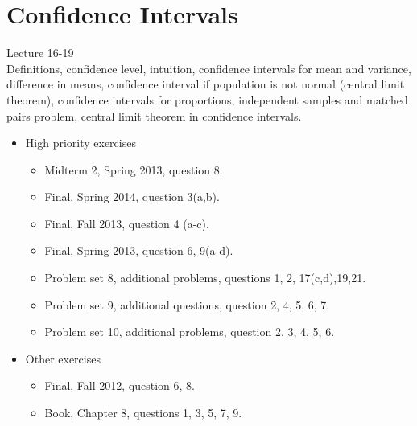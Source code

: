 \documentclass[11pt]{article}
\begin{document}
\section{Confidence Intervals}
Lecture 16-19\\[0.2in]
Definitions, confidence level, intuition, confidence intervals for mean and variance, difference in means, confidence interval if population is not normal (central limit theorem), confidence intervals for proportions, independent samples and matched pairs problem, central limit theorem in confidence intervals. 
\begin{itemize}
	\item High priority exercises
		\begin{itemize}
			\item Midterm 2, Spring 2013, question 8.
			\item Final, Spring 2014, question 3(a,b).
			\item Final, Fall 2013, question 4 (a-c).
			\item Final, Spring 2013, question 6, 9(a-d).
			\item Problem set 8, additional problems, questions 1, 2, 17(c,d),19,21.
			\item Problem set 9, additional questions, question 2, 4, 5, 6, 7.
			\item Problem set 10, additional problems, question 2, 3, 4, 5, 6.
		\end{itemize}
	\item Other exercises
	\begin{itemize}
	 \item Final, Fall 2012, question 6, 8.
	 \item Book, Chapter 8, questions 1, 3, 5, 7, 9.
	\end{itemize}
\end{itemize}
\end{document}
